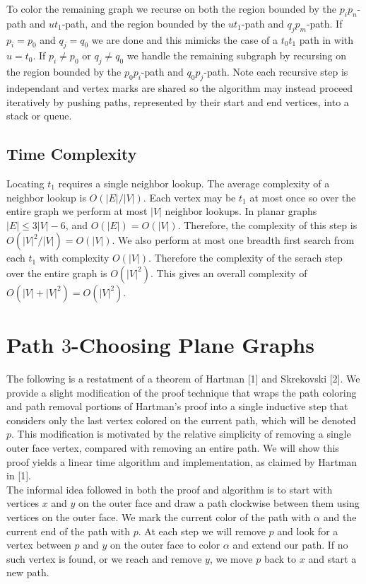\documentclass[11pt,letter]{article}
\begin{document}
\noindent To color the remaining graph we recurse on both the region
bounded by the $p_ip_n$-path and $ut_1$-path, and the region bounded by the $ut_1$-path and $q_jp_m$-path.
If $p_i=p_0$ and $q_j=q_0$ we are done and this mimicks the case of a $t_0t_1$ path in with $u=t_0$.
If $p_i\ne p_0$ or $q_j\ne q_0$ we handle the remaining subgraph by recursing on the region bounded by the
$p_0p_i$-path and $q_0p_j$-path. Note each recursive step is independant and vertex marks are shared so the
algorithm may instead proceed iteratively by pushing paths, represented by their start and end
vertices, into a stack or queue.

\subsection*{Time Complexity}

\noindent Locating $t_1$ requires a single neighbor lookup. The average complexity of a neighbor lookup is
$O(|E|/|V|)$. Each vertex may be $t_1$ at most once so over the entire graph we perform at most $|V|$ neighbor
lookups. In planar graphs $|E|\le 3|V|-6$, and $O(|E|)=O(|V|)$. Therefore, the
complexity of this step is $O(|V|^2/|V|)=O(|V|)$. We also perform at most one breadth first
search from each $t_1$ with complexity $O(|V|)$. Therefore the complexity of the serach step over the
entire graph is $O(|V|^2)$. This gives an overall complexity of $O(|V|+|V|^2)=O(|V|^2)$.

\section{Path $3$-Choosing Plane Graphs}

The following is a restatment of a theorem of Hartman [1] and Skrekovski [2]. We provide a slight modification of
the proof technique that wraps the path coloring and path removal portions of Hartman's proof into a single inductive
step that considers only the last vertex colored on the current path, which will be denoted $p$.
This modification is motivated by the relative simplicity of removing a single outer face vertex,
compared with removing an entire path.
We will show this proof yields a linear time algorithm and implementation, as claimed by Hartman in [1].\\

\noindent The informal idea followed in both the proof and algorithm is to start with
vertices $x$ and $y$ on the outer face and draw a path clockwise between them using vertices on the outer face.
We mark the current color of the path with $\alpha$ and the current end of the path with $p$. At each step we will remove
$p$ and look for a vertex between $p$ and $y$ on the outer face to color $\alpha$ and extend our path. If no
such vertex is found, or we reach and remove $y$, we move $p$ back to $x$ and start a new path.\\
\end{document}
